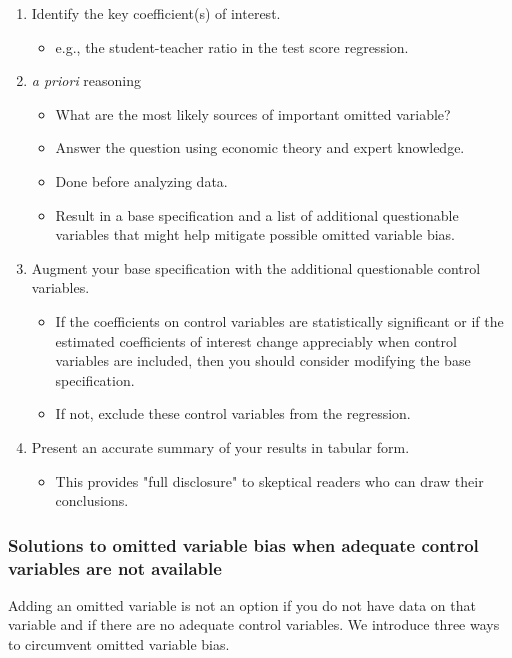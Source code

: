 \documentclass[a4paper,11pt]{article}
\begin{document}
\begin{itemize}
\begin{enumerate}
\item Identify the key coefficient(s) of interest.
\begin{itemize}
\item e.g., the student-teacher ratio in the test score regression.
\end{itemize}
\item \emph{a priori} reasoning
\begin{itemize}
\item What are the most likely sources of important omitted variable?
\item Answer the question using economic theory and expert knowledge.
\item Done before analyzing data.
\item Result in a base specification and a list of additional
questionable variables that might help mitigate possible omitted
variable bias.
\end{itemize}
\item Augment your base specification with the additional questionable
control variables.
\begin{itemize}
\item If the coefficients on control variables are statistically
significant or if the estimated coefficients of interest change
appreciably when control variables are included, then you should
consider modifying the base specification.
\item If not, exclude these control variables from the regression.
\end{itemize}
\item Present an accurate summary of your results in tabular form.
\begin{itemize}
\item This provides "full disclosure" to skeptical readers who can draw
their conclusions.
\end{itemize}
\end{enumerate}
\end{itemize}
\subsubsection*{Solutions to omitted variable bias when adequate control variables are not available}
\label{sec:org4ed7abe}
Adding an omitted variable is not an option if you do not have data on
that variable and if there are no adequate control variables. We
introduce three ways to circumvent omitted variable bias. 
\end{document}
